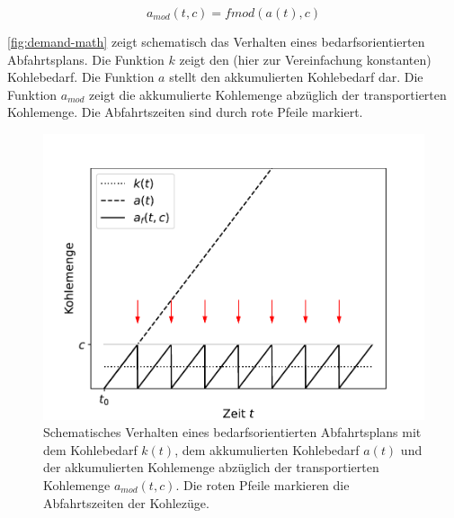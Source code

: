 \begin{equation}
    a_{mod}(t, c)=fmod(a(t), c)\label{eq:kohle-fmod}
\end{equation}

\autoref{fig:demand-math} zeigt schematisch das Verhalten eines bedarfsorientierten Abfahrtsplans. Die Funktion $k$ zeigt den (hier zur Vereinfachung konstanten) Kohlebedarf. Die Funktion $a$ stellt den akkumulierten Kohlebedarf dar. Die Funktion $a_{mod}$ zeigt die akkumulierte Kohlemenge abzüglich der transportierten Kohlemenge. Die Abfahrtszeiten sind durch rote Pfeile markiert.

\begin{figure}[!ht]
	\centering
	\includegraphics[width=1.0\linewidth]{images/demand-math.pdf}
	\caption{Schematisches Verhalten eines bedarfsorientierten Abfahrtsplans mit dem Kohlebedarf $k(t)$, dem akkumulierten Kohlebedarf $a(t)$ und der akkumulierten Kohlemenge abzüglich der transportierten Kohlemenge $a_{mod}(t,c)$. Die roten Pfeile markieren die Abfahrtszeiten der Kohlezüge.}
	\label{fig:demand-math}
\end{figure}